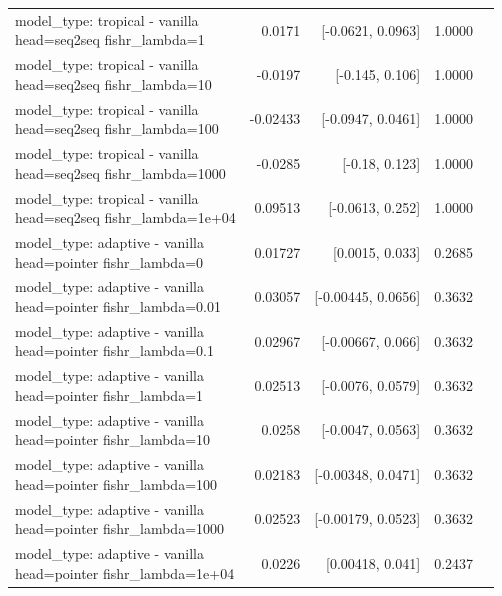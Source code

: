 \documentclass[10pt]{article}
\makeatletter
\newcommand{\stackcell}[1]{\begin{tabular}[t]{@{}l@{}}#1\end{tabular}}
\makeatother
\begin{document}
{\begin{longtable}{lrrrl}
\stackcell{model\_type: tropical - vanilla\\\footnotesize head=seq2seq fishr\_lambda=1 } & 0.0171 & [-0.0621, 0.0963] & 1.0000 & \\
\stackcell{model\_type: tropical - vanilla\\\footnotesize head=seq2seq fishr\_lambda=10 } & -0.0197 & [-0.145, 0.106] & 1.0000 & \\
\stackcell{model\_type: tropical - vanilla\\\footnotesize head=seq2seq fishr\_lambda=100 } & -0.02433 & [-0.0947, 0.0461] & 1.0000 & \\
\stackcell{model\_type: tropical - vanilla\\\footnotesize head=seq2seq fishr\_lambda=1000 } & -0.0285 & [-0.18, 0.123] & 1.0000 & \\
\stackcell{model\_type: tropical - vanilla\\\footnotesize head=seq2seq fishr\_lambda=1e+04 } & 0.09513 & [-0.0613, 0.252] & 1.0000 & \\
\stackcell{model\_type: adaptive - vanilla\\\footnotesize head=pointer fishr\_lambda=0 } & 0.01727 & [0.0015, 0.033] & 0.2685 & \\
\stackcell{model\_type: adaptive - vanilla\\\footnotesize head=pointer fishr\_lambda=0.01 } & 0.03057 & [-0.00445, 0.0656] & 0.3632 & \\
\stackcell{model\_type: adaptive - vanilla\\\footnotesize head=pointer fishr\_lambda=0.1 } & 0.02967 & [-0.00667, 0.066] & 0.3632 & \\
\stackcell{model\_type: adaptive - vanilla\\\footnotesize head=pointer fishr\_lambda=1 } & 0.02513 & [-0.0076, 0.0579] & 0.3632 & \\
\stackcell{model\_type: adaptive - vanilla\\\footnotesize head=pointer fishr\_lambda=10 } & 0.0258 & [-0.0047, 0.0563] & 0.3632 & \\
\stackcell{model\_type: adaptive - vanilla\\\footnotesize head=pointer fishr\_lambda=100 } & 0.02183 & [-0.00348, 0.0471] & 0.3632 & \\
\stackcell{model\_type: adaptive - vanilla\\\footnotesize head=pointer fishr\_lambda=1000 } & 0.02523 & [-0.00179, 0.0523] & 0.3632 & \\
\stackcell{model\_type: adaptive - vanilla\\\footnotesize head=pointer fishr\_lambda=1e+04 } & 0.0226 & [0.00418, 0.041] & 0.2437 & \\

\end{longtable}}
\end{document}
